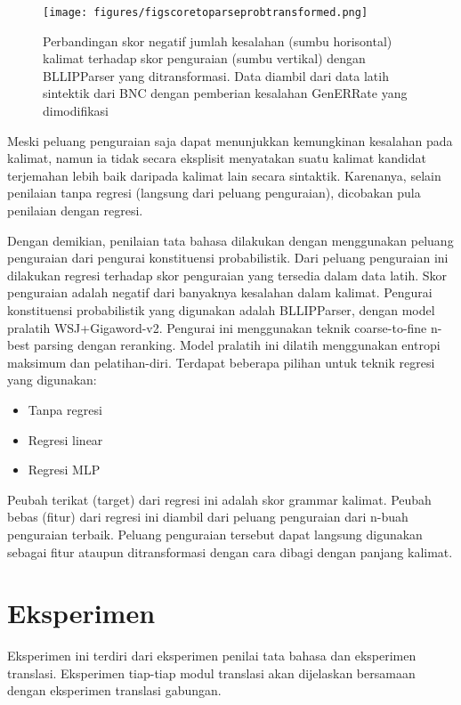 \documentclass[conference]{IEEEtran}
\begin{document}
\begin{figure}[h]
\centerline{\texttt{[image: figures/figscoretoparseprobtransformed.png]}}
\caption{Perbandingan skor negatif jumlah kesalahan (sumbu horisontal) kalimat terhadap skor penguraian (sumbu vertikal) dengan BLLIPParser yang ditransformasi. Data diambil dari data latih sintektik dari BNC dengan pemberian kesalahan GenERRate yang dimodifikasi}
\label{figscoretoparseprobtransformed}
\end{figure}

Meski peluang penguraian saja dapat menunjukkan kemungkinan kesalahan pada kalimat, namun ia tidak secara eksplisit menyatakan suatu kalimat kandidat terjemahan lebih baik daripada kalimat lain secara sintaktik. Karenanya, selain penilaian tanpa regresi (langsung dari peluang penguraian), dicobakan pula penilaian dengan regresi.

Dengan demikian, penilaian tata bahasa dilakukan dengan menggunakan peluang penguraian dari pengurai konstituensi probabilistik. Dari peluang penguraian ini dilakukan regresi terhadap skor penguraian yang tersedia dalam data latih. Skor penguraian adalah negatif dari banyaknya kesalahan dalam kalimat.
Pengurai konstituensi probabilistik yang digunakan adalah BLLIPParser\cite{b5}\cite{b6}\cite{b7}\cite{b8}, dengan model pralatih WSJ+Gigaword-v2. Pengurai ini menggunakan teknik coarse-to-fine n-best parsing dengan reranking. Model pralatih ini dilatih menggunakan entropi maksimum dan pelatihan-diri.
Terdapat beberapa pilihan untuk teknik regresi yang digunakan:

\begin{itemize}
\item Tanpa regresi
\item Regresi linear
\item Regresi MLP
\end{itemize}

Peubah terikat (target) dari regresi ini adalah skor grammar kalimat. Peubah bebas (fitur) dari regresi ini diambil dari peluang penguraian dari n-buah penguraian terbaik. Peluang penguraian tersebut dapat langsung digunakan sebagai fitur ataupun ditransformasi dengan cara dibagi dengan panjang kalimat.

\section{Eksperimen}

Eksperimen ini terdiri dari eksperimen penilai tata bahasa dan eksperimen translasi. Eksperimen tiap-tiap modul translasi akan dijelaskan bersamaan dengan eksperimen translasi gabungan.
\end{document}
